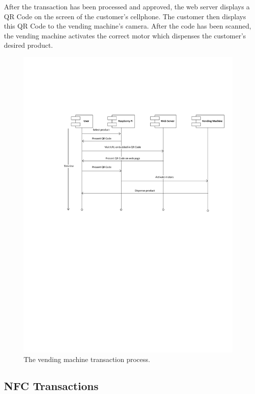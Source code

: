 After the transaction has been processed and approved, the web server displays a
QR Code on the screen of the customer's cellphone. The customer then displays
this QR Code to the vending machine's camera. After the code has been
scanned, the vending machine activates the correct motor which dispenses the
customer's desired product.

\begin{figure}
 \centering 
 \includegraphics[clip=true, trim = 50 400 0 140, scale=0.7]{qrcode_processflow_user}
 \caption{The vending machine transaction process.}
 \label{fig:vm_prog_interaction}
\end{figure}

\subsection{NFC Transactions}

